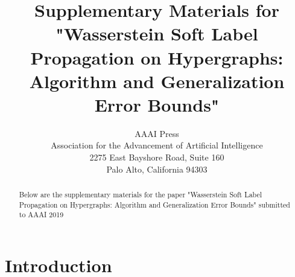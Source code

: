 \documentclass[letterpaper]{article} %
\begin{document}
\title{Supplementary Materials for "Wasserstein Soft Label Propagation on Hypergraphs: Algorithm and Generalization Error Bounds"}
\author{AAAI Press\\
Association for the Advancement of Artificial Intelligence\\
2275 East Bayshore Road, Suite 160\\
Palo Alto, California 94303\\
}
\maketitle

\begin{abstract}
Below are the supplementary materials for the paper  "Wasserstein Soft Label Propagation on Hypergraphs: Algorithm and Generalization Error Bounds"   submitted to AAAI 2019 
\end{abstract}
	
\section{Introduction}

	
	
%
%  	
\end{document}
